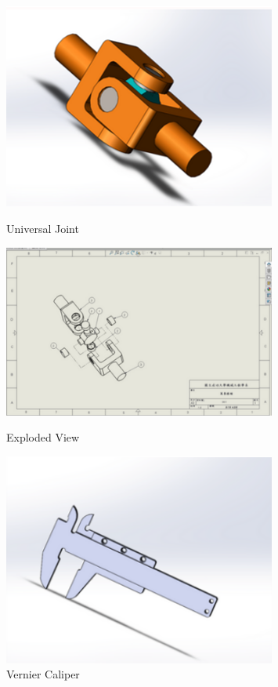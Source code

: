 \documentclass[10pt, letterpaper]{article}
\begin{document}
\begin{figure}[!b]
        \vspace{0.5 cm}
        
        \begin{minipage}[c]{0.33\linewidth}
            \centering
            \includegraphics[width=0.8\textwidth]{fig/Mechanical Design/萬象接頭.png}
            \caption{Universal Joint}
        \end{minipage}%
        \begin{minipage}[c]{0.33\linewidth}
            \centering
            \includegraphics[width=0.8\textwidth]{fig/Mechanical Design/萬象接頭之爆炸圖.png}
            \caption{Exploded View}
        \end{minipage}%
        \begin{minipage}[c]{0.33\linewidth}
            \centering
            \includegraphics[width=0.8\textwidth]{fig/Mechanical Design/游標卡尺.png}
            \caption{Vernier Caliper}
        \end{minipage}
        \vspace{0.8cm} %
    \end{figure}
   
\end{document}
